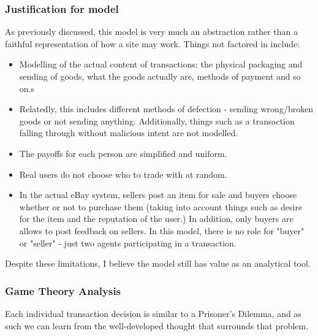 \documentclass{article}
\begin{document}
\subsubsection{Justification for model}
\label{sec:justification-model}
As previously discussed, this model is very much an abstraction rather than a faithful representation of how a site may work. Things not factored in include:
\begin{itemize}
	\item Modelling of the actual content of transactions: the physical packaging and sending of goods, what the goods actually are, methods of payment and so on.s
	\item Relatedly, this includes different methods of defection - sending wrong/broken goods or not sending anything. Additionally, things such as a transaction falling through without malicious intent are not modelled.
	\item The payoffs for each person are simplified and uniform.
	\item Real users do not choose who to trade with at random.
	\item In the actual eBay system, sellers post an item for sale and buyers choose whether or not to purchase them (taking into account things such as desire for the item and the reputation of the user.) In addition, only buyers are allows to post feedback on sellers. In this model, there is no role for "buyer" or "seller" - just two agents participating in a transaction.
\end{itemize}

Despite these limitations, I believe the model still has value as an analytical tool.


\subsubsection{Game Theory Analysis}
\label{sec:game-theory}
Each individual transaction decision is similar to a Prisoner's Dilemma, and as such we can learn from the well-developed thought that surrounds that problem.
\end{document}
